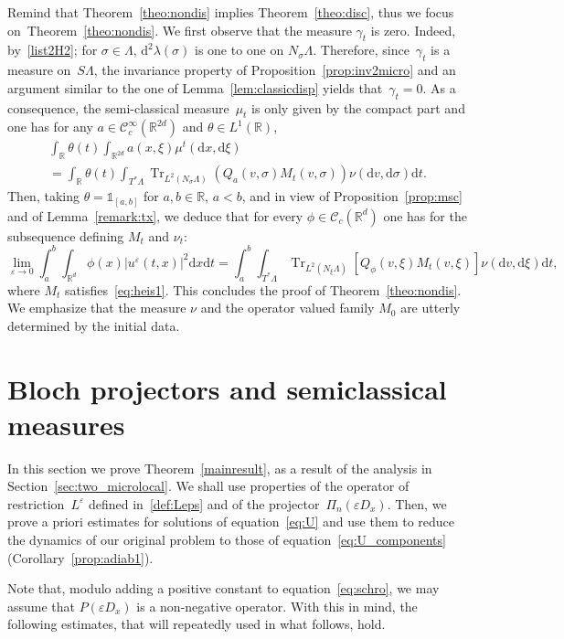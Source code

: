 \documentclass[AHL,Unicode,longabstracts]{cedram}
\DeclareMathOperator{\Trr}{Tr}
\newcommand*\R{{\mathbb R}}
\newcommand*\eps{\varepsilon}
\numberwithin{equation}{section}
\newcommand*{\dd}{\mathrm{d}}
\newcommand*{\dt}{\dd t}
\newcommand*{\dx}{\dd x}
\newcommand*{\dv}{\dd v}
\newcommand*{\dxi}{\dd \xi}
\begin{document}
Remind that Theorem~\ref{theo:nondis} implies Theorem~\ref{theo:disc}, thus we focus on~Theorem~\ref{theo:nondis}. We first observe that the measure $\gamma_t$ is zero. Indeed, by~\eqref{list2H2}; for $\sigma\in\Lambda$, $\dd^2\lambda(\sigma)$ is one to one on $N_\sigma\Lambda$. Therefore, since~$\gamma_t$ is a measure on~$S\Lambda$, the invariance property of Proposition~\ref{prop:inv2micro} and an argument similar to the one of Lemma~\ref{lem:classicdisp} yields that~$\gamma_t=0$. As a consequence, the semi-classical measure~$\mu_t$ is only given by the compact part and one has for any $a\in{\mathcal C}_c^\infty(\R^{2d})$ and $\theta\in L^1(\R)$,
\begin{multline*}
\int_\R \theta(t)\int_{\R^{2d} }a(x,\xi) \mu^t(\dx,\dxi)\\
=\int_\R \theta(t) \int_{T^* \Lambda} {\Trr}_{L^2(N_\sigma\Lambda)}(Q_a(v,\sigma)M_t(v, \sigma))\nu (\mathrm{d}v,\mathrm{d}\sigma)\mathrm{d}t.
\end{multline*}
Then, taking $\theta=\mathds{1}_{[a,b]}$ for $a,b\in\R$, $a<b$, and in view of Proposition~\ref{prop:msc} and of Lemma~\ref{remark:tx}, we deduce that for every $\phi\in \mathcal{C}_c(\R^d)$ one has for the subsequence defining $M_t$ and $\nu_t$:
\[
\lim_{\eps\rightarrow 0}\int_a^b\int_{\R^d}\phi(x)|u^{\eps}(t,x)|^2\dx\dt=\int_a^b \int_{T^*\Lambda}\Trr_{L^2(N_\xi\Lambda)}\left[Q_\phi(v,\xi)M_t(v,\xi)\right]\nu(\dv,\dxi)\dt,
\]
where $M_t$ satisfies~\eqref{eq:heis1}. This concludes the proof of Theorem~\ref{theo:nondis}. We emphasize that the measure $\nu$ and the operator valued family $M_0$ are utterly determined by the initial data.



\section{Bloch projectors and semiclassical measures}\label{sec:5}

In this section we prove Theorem~\ref{mainresult}, as a result of the analysis in Section~\ref{sec:two_microlocal}. We shall use properties of the operator of restriction~$L^\eps$ defined in~\eqref{def:Leps} and of the projector~$\Pi_n(\eps D_x)$. Then, we prove a priori estimates for solutions of equation~\eqref{eq:U} and use them to reduce the dynamics of our original problem to those of equation~\eqref{eq:U_components} (Corollary~\ref{prop:adiab1}).



Note that, modulo adding a positive constant to equation~\eqref{eq:schro}, we may assume that $P(\eps D_x)$ is a non-negative operator. With this in mind, the following estimates, that will repeatedly used in what follows, hold.
\end{document}
